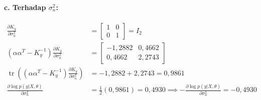 \documentclass[11pt,a4paper]{article}
\def\boldsymbol#1{#1}%
\def\mathbf#1{#1}%
\begin{document}
\paragraph*{c. Terhadap \texorpdfstring{$\sigma_n^2$}{sigma_n^2}:}
\begin{align}
\frac{\partial K_y}{\partial \sigma_n^2} &= \begin{bmatrix} 1 & 0 \\ 0 & 1 \end{bmatrix} = I_2 \\
\left( \boldsymbol{\alpha}\boldsymbol{\alpha}^T - K_y^{-1} \right) \frac{\partial K_y}{\partial \sigma_n^2} &= \begin{bmatrix} -1{,}2882 & 0{,}4662 \\ 0{,}4662 & 2{,}2743 \end{bmatrix} \\
\operatorname{tr}\left( \left( \boldsymbol{\alpha}\boldsymbol{\alpha}^T - K_y^{-1} \right) \frac{\partial K_y}{\partial \sigma_n^2} \right) &= -1{,}2882 + 2{,}2743 = 0{,}9861 \\
\frac{\partial \log p(\mathbf{y}|X, \boldsymbol{\theta})}{\partial \sigma_n^2} &= \frac{1}{2} (0{,}9861) = 0{,}4930 \implies -\frac{\partial \log p(\mathbf{y}|X, \boldsymbol{\theta})}{\partial \sigma_n^2} = -0{,}4930
\end{align}
\end{document}
